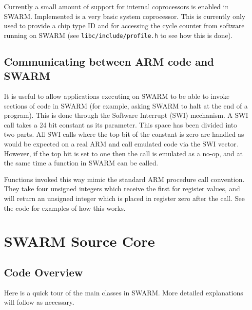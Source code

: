 \documentclass[10pt,a4paper]{article}
\begin{document}
Currently a small amount of support for internal coprocessors is
enabled in SWARM. Implemented is a very basic system coprocessor. This
is currently only used to provide a chip type ID and for accessing the
cycle counter from software running on SWARM (see
\texttt{libc/include/profile.h} to see how this is done). 


\subsection{Communicating between ARM code and SWARM} %
\label{sec:comms}                                     %

It is useful to allow applications executing on SWARM to be able to
invoke sections of code in SWARM (for example, asking SWARM to halt at
the end of a program). This is done through the Software
Interrupt (SWI) mechanism. A
SWI call takes a 24 bit constant as its parameter. This space has
been divided into two parts. All SWI calls where the top bit of the
constant is zero are handled as would be expected on a real ARM and
call emulated code via the SWI vector. However, if the top bit is set
to one then the call is emulated as a no-op, and at the same time a
function in SWARM can be called. 

Functions invoked this way mimic the standard ARM procedure call
convention. They take four unsigned integers which receive the first
for register values, and will return an unsigned integer which is
placed in register zero after the call.
See the code for examples of how this works.



\section{SWARM Source Core} %
\label{sec:code}            %

\subsection{Code Overview} %
\label{sec:overview}       %

Here is a quick tour of the main classes in SWARM. More detailed
explanations will follow as necessary. 
\end{document}
